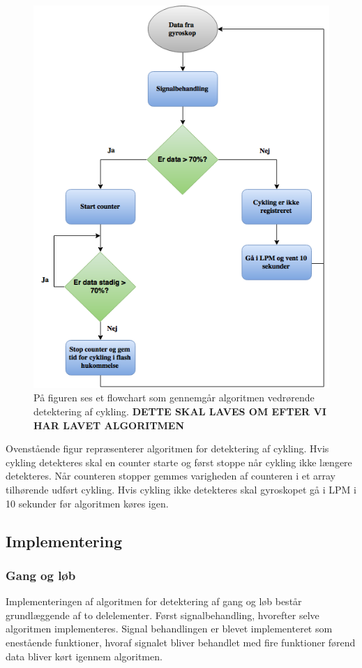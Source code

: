 \begin{figure}[H]
	\centering
	\includegraphics[scale=0.6]{figures/cDesign/algoritme_cykling.png}
	\caption{På figuren ses et flowchart som gennemgår algoritmen vedrørende detektering af cykling. \textbf{DETTE SKAL LAVES OM EFTER VI HAR LAVET ALGORITMEN}}
	\label{fig:algoritme_cykling}
\end{figure}

Ovenstående figur repræsenterer algoritmen for detektering af cykling. Hvis cykling detekteres skal en counter starte og først stoppe når cykling ikke længere detekteres. Når counteren stopper gemmes varigheden af counteren i et array tilhørende udført cykling. Hvis cykling ikke detekteres skal gyroskopet gå i LPM i 10 sekunder før algoritmen køres igen. 


\subsection{Implementering}
\subsubsection{Gang og løb}
Implementeringen af algoritmen for detektering af gang og løb består grundlæggende af to delelementer. Først signalbehandling, hvorefter selve algoritmen implementeres. Signal behandlingen er blevet implementeret som enestående funktioner, hvoraf signalet bliver behandlet med fire funktioner førend data bliver kørt igennem algoritmen.

